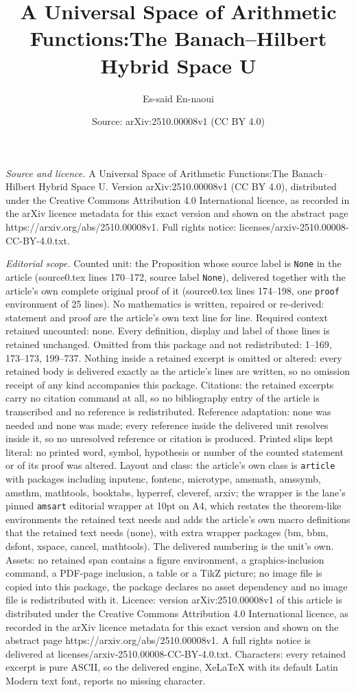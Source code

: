 \documentclass[10pt,a4paper]{amsart}
\title[A Universal Space of Arithmetic Functions:The Banach--Hilber]{A Universal Space of Arithmetic Functions:The Banach--Hilbert Hybrid Space U}
\author{Es-said En-naoui}
\date{Source: arXiv:2510.00008v1 (CC BY 4.0)}
\begin{document}
\maketitle

\noindent\emph{Source and licence.} A Universal Space of Arithmetic Functions:The Banach--Hilbert Hybrid Space U. Version arXiv:2510.00008v1 (CC BY 4.0), distributed under the Creative Commons Attribution 4.0 International licence, as recorded in the arXiv licence metadata for this exact version and shown on the abstract page https://arxiv.org/abs/2510.00008v1. Full rights notice: licenses/arxiv-2510.00008-CC-BY-4.0.txt.\par\smallskip

\noindent\textit{Editorial scope.} Counted unit: the Proposition whose source label is \texttt{None} in the article (source0.tex lines 170--172, source label \texttt{None}), delivered together with the article's own complete original proof of it (source0.tex lines 174--198, one \texttt{proof} environment of 25 lines). No mathematics is written, repaired or re-derived: statement and proof are the article's own text line for line. Required context retained uncounted: none. Every definition, display and label of those lines is retained unchanged. Omitted from this package and not redistributed: 1--169, 173--173, 199--737. Nothing inside a retained excerpt is omitted or altered: every retained body is delivered exactly as the article's lines are written, so no omission receipt of any kind accompanies this package. Citations: the retained excerpts carry no citation command at all, so no bibliography entry of the article is transcribed and no reference is redistributed. Reference adaptation: none was needed and none was made; every reference inside the delivered unit resolves inside it, so no unresolved reference or citation is produced. Printed slips kept literal: no printed word, symbol, hypothesis or number of the counted statement or of its proof was altered. Layout and class: the article's own class is \texttt{article} with packages including inputenc, fontenc, microtype, amsmath, amssymb, amsthm, mathtools, booktabs, hyperref, cleveref, arxiv; the wrapper is the lane's pinned \texttt{amsart} editorial wrapper at 10pt on A4, which restates the theorem-like environments the retained text needs and adds the article's own macro definitions that the retained text needs (none), with extra wrapper packages (bm, bbm, dsfont, xspace, cancel, mathtools). The delivered numbering is the unit's own. Assets: no retained span contains a figure environment, a graphics-inclusion command, a PDF-page inclusion, a table or a TikZ picture; no image file is copied into this package, the package declares no asset dependency and no image file is redistributed with it. Licence: version arXiv:2510.00008v1 of this article is distributed under the Creative Commons Attribution 4.0 International licence, as recorded in the arXiv licence metadata for this exact version and shown on the abstract page https://arxiv.org/abs/2510.00008v1. A full rights notice is delivered at licenses/arxiv-2510.00008-CC-BY-4.0.txt. Characters: every retained excerpt is pure ASCII, so the delivered engine, XeLaTeX with its default Latin Modern text font, reports no missing character.
\end{document}
